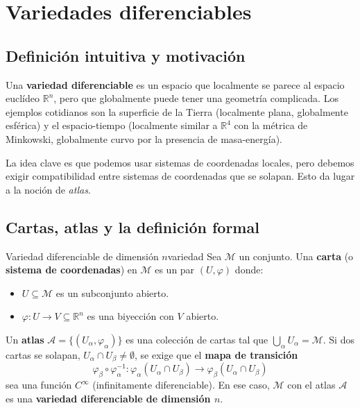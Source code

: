 \section{Variedades diferenciables}

\subsection{Definición intuitiva y motivación}

Una \textbf{variedad diferenciable} es un espacio que localmente se parece al espacio euclídeo $\mathbb{R}^n$, pero que globalmente puede tener una geometría complicada. Los ejemplos cotidianos son la superficie de la Tierra (localmente plana, globalmente esférica) y el espacio-tiempo (localmente similar a $\mathbb{R}^4$ con la métrica de Minkowski, globalmente curvo por la presencia de masa-energía).

La idea clave es que podemos usar sistemas de coordenadas locales, pero debemos exigir compatibilidad entre sistemas de coordenadas que se solapan. Esto da lugar a la noción de \emph{atlas}.

\subsection{Cartas, atlas y la definición formal}

\begin{definicion}{Variedad diferenciable de dimensión $n$}{variedad}
Sea $\mathcal{M}$ un conjunto. Una \textbf{carta} (o \textbf{sistema de coordenadas}) en $\mathcal{M}$ es un par $(U, \varphi)$ donde:
\begin{itemize}[leftmargin=2em]
  \item $U \subseteq \mathcal{M}$ es un subconjunto abierto.
  \item $\varphi: U \to V \subseteq \mathbb{R}^n$ es una biyección con $V$ abierto.
\end{itemize}
Un \textbf{atlas} $\mathcal{A} = \{(U_\alpha, \varphi_\alpha)\}$ es una colección de cartas tal que $\bigcup_\alpha U_\alpha = \mathcal{M}$. Si dos cartas se solapan, $U_\alpha \cap U_\beta \neq \emptyset$, se exige que el \textbf{mapa de transición}
\[
  \varphi_\beta \circ \varphi_\alpha^{-1} : \varphi_\alpha(U_\alpha \cap U_\beta) \to \varphi_\beta(U_\alpha \cap U_\beta)
\]
sea una función $C^\infty$ (infinitamente diferenciable). En ese caso, $\mathcal{M}$ con el atlas $\mathcal{A}$ es una \textbf{variedad diferenciable de dimensión $n$}.
\end{definicion}

